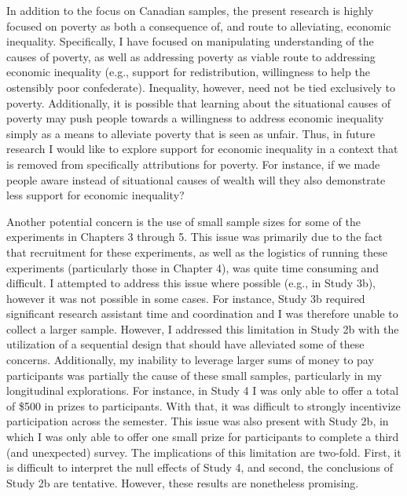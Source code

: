 \documentclass{sfuthesis}
\begin{document}
In addition to the focus on Canadian samples, the present research is highly focused on poverty as both a consequence of, and route to alleviating, economic inequality. Specifically, I have focused on manipulating understanding of the causes of poverty, as well as addressing poverty as viable route to addressing economic inequality (e.g., support for redistribution, willingness to help the ostensibly poor confederate). Inequality, however, need not be tied exclusively to poverty. Additionally, it is possible that learning about the situational causes of poverty may push people towards a willingness to address economic inequality simply as a means to alleviate poverty that is seen as unfair. Thus, in future research I would like to explore support for economic inequality in a context that is removed from specifically attributions for poverty. For instance, if we made people aware instead of situational causes of wealth will they also demonstrate less support for economic inequality? 

Another potential concern is the use of small sample sizes for some of the experiments in Chapters 3 through 5. This issue was primarily due to the fact that recruitment for these experiments, as well as the logistics of running these experiments (particularly those in Chapter 4), was quite time consuming and difficult. I attempted to address this issue where possible (e.g., in Study 3b), however it was not possible in some cases. For instance, Study 3b required significant research assistant time and coordination and I was therefore unable to collect a larger sample. However, I addressed this limitation in Study 2b with the utilization of a sequential design that should have alleviated some of these concerns. Additionally, my inability to leverage larger sums of money to pay participants was partially the cause of these small samples, particularly in my longitudinal explorations. For instance, in Study 4 I was only able to offer a total of \$500 in prizes to participants. With that, it was difficult to strongly incentivize participation across the semester. This issue was also present with Study 2b, in which I was only able to offer one small prize for participants to complete a third (and unexpected) survey. The implications of this limitation are two-fold. First, it is difficult to interpret the null effects of Study 4, and second, the conclusions of Study 2b are tentative. However, these results are nonetheless promising.
\end{document}
